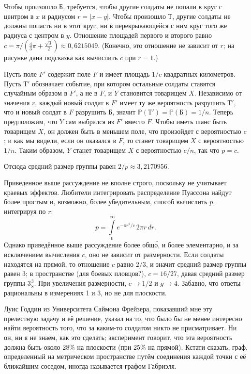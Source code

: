 Чтобы произошло $\text{Б}$, требуется, чтобы другие солдаты не попали в круг с центром в $x$ и радиусом $r=|x-y|$.
Чтобы произошло $\text{Т}$, другие солдаты не должны попасть ни в этот круг, ни в перекрывающейся с ним круг того же радиуса с центром в $y$.
Отношение площадей первого и второго равно $c=\pi/(\tfrac43\pi+\tfrac{\sqrt{3}}{2}) \approx 0{,}6215049$. (Конечно, это отношение не зависит от $r$; на рисунке дана подсказка как вычислить $c$ при $r=1$.)

Пусть поле $F'$ содержит поле $F$ и имеет площадь $1/c$ квадратных километров.
Пусть $\text{Т}'$ обозначает событие, при котором остальные солдаты ставятся случайным образом в $F'$, а не в $F$, и $Y$ становится товарищем $X$.
Независимо от значения $r$, каждый новый солдат в $F'$ имеет ту же вероятность разрушить $\text{Т}'$, что и новый солдат в $F$ разрушить $\text{Б}$, значит $\mathbb{P}(\text{Т}')= \mathbb{P}(\text{Б}) = 1/n$.
Теперь предположим, что $Y$ сам выбрался из $F'$ вместо $F$.
Чтобы иметь шанс быть товарищем $X$, он должен быть в меньшем поле, что произойдет с вероятностью $c$; и как мы видели, если он оказался в $F$, то станет товарищем $X$ с вероятностью $1/n$.
Таким образом, $Y$ станет товарищем $X$ с вероятностью $c/n$, так что $p=c$.

Отсюда средний размер группы равен $2/p\approx3{,}2170956$.
\heart

Приведенное выше рассуждение не вполне строго, поскольку не учитывает краевых эффектов.
Любители интегрировать распределение Пуассона 
найдут более простым и, возможно, более убедительным, способ вычислить $p$, интегрируя по $r$:
\[p=\int\limits_0^\infty e^{-\pi r^2/c}\,2\pi r\, dr.\]
Однако приведённое выше рассуждение более общ\'{о}, и более элементарно, и за исключением вычисления $c$, оно не зависит от размерности.
Если солдаты находятся на прямой, то отношение $c$ равно $2/3$, и значит средний размер группы равен 3;
в пространстве (для боевых пловцов?), $c = 16/27$, давая средний размер группы $3\tfrac38$.
При увеличения размерности, $c\to 1/2$ и $g\to 4$. 
Забавно, что ответы рациональны в измерениях 1 и 3, но не для плоскости.

Луис Годдин из Университета Саймона Фрейзера, показавший мне эту прелестную задачу и её решение, указал на то, что было бы не менее интересно найти вероятность того, что за каким-то солдатом никто не присматривает.
Ни он, ни я не знаем, как это сделать; эксперимент говорит, что эта вероятность должна быть около $28\%$ на плоскости (при $25\%$ на прямой).
Кстати сказать, граф, определенный на метрическом пространстве путём соединения каждой точки с её ближайшим соседом, иногда называется графом Габриэля.

